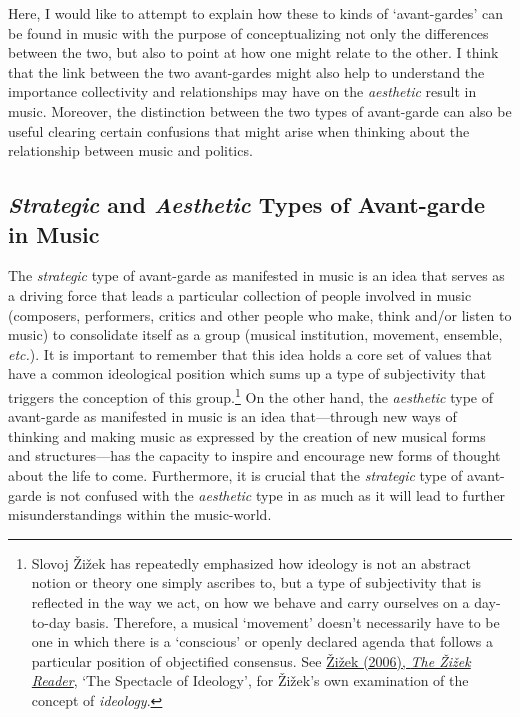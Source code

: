 Here, I would like to attempt to explain how these to kinds of `avant-gardes' can be found in music with the purpose of conceptualizing not only the differences between the two, but also to point at how one might relate to the other. I think that the link between the two avant-gardes might also help to understand the importance collectivity and relationships may have on the \emph{aesthetic} result in music. Moreover, the distinction between the two types of avant-garde can also be useful clearing certain confusions that might arise when thinking about the relationship between music and politics.  

\subsection{\emph{Strategic} and \emph{Aesthetic} Types of Avant-garde in Music}

The \emph{strategic} type of avant-garde as manifested in music is an idea that serves as a driving force that leads a particular collection of people involved in music (composers, performers, critics and other people who make, think and/or listen to music) to consolidate itself as a group (musical institution, movement, ensemble, \emph{etc.}). It is important to remember that this idea holds a core set of values that have a common ideological position which sums up a type of subjectivity that triggers the conception of this group.\footnote{Slovoj \v{Z}i\v{z}ek has repeatedly emphasized how ideology is not an abstract notion or theory one simply ascribes to, but a type of subjectivity that is reflected in the way we act, on how we behave and carry ourselves on a day-to-day basis. Therefore, a musical `movement' doesn't necessarily have to be one in which there is a `conscious' or openly declared agenda that follows a particular position of objectified consensus. See \hyperlink{zizekreader}{\v{Z}i\v{z}ek (2006), \emph{The \v{Z}i\v{z}ek Reader}}, `The Spectacle of Ideology', for \v{Z}i\v{z}ek's own examination of the concept of \emph{ideology}.} On the other hand,  the \emph{aesthetic} type of avant-garde as manifested in music is an idea that---through new ways of thinking and making music as expressed by the creation of new musical forms and structures---has the capacity to inspire and encourage new forms of thought about the life to come.  Furthermore, it is crucial that the \emph{strategic} type of avant-garde is not confused with the \emph{aesthetic} type in as much as it will lead to further misunderstandings within the music-world. 


